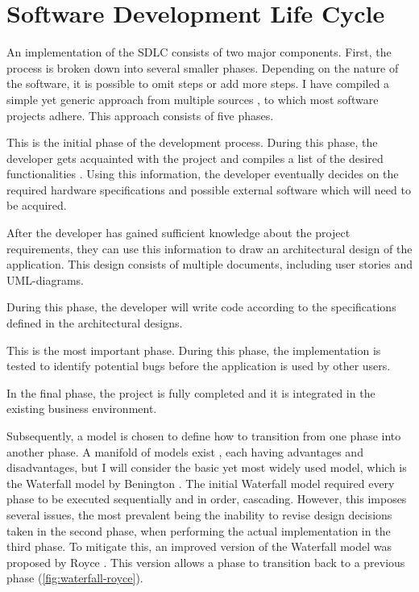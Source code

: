 
\section{Software Development Life Cycle}\label{sec:se-sdlc}
An implementation of the SDLC consists of two major components. First, the process is broken down into several smaller phases. Depending on the nature of the software, it is possible to omit steps or add more steps. I have compiled a simple yet generic approach from multiple sources \cite{2010govardhan, 7106435}, to which most software projects adhere. This approach consists of five phases.
\begin{enumerate}
	 This is the initial phase of the development process. During this phase, the developer gets acquainted with the project and compiles a list of the desired functionalities \cite{7106435}. Using this information, the developer eventually decides on the required hardware specifications and possible external software which will need to be acquired.
	
	 After the developer has gained sufficient knowledge about the project requirements, they can use this information to draw an architectural design of the application. This design consists of multiple documents, including user stories and UML-diagrams.
	
	 During this phase, the developer will write code according to the specifications defined in the architectural designs.
	
	 This is the most important phase. During this phase, the implementation is tested to identify potential bugs before the application is used by other users.
	
	 In the final phase, the project is fully completed and it is integrated in the existing business environment.
\end{enumerate}

\noindent Subsequently, a model is chosen to define how to transition from one phase into another phase. A manifold of models exist \cite{2010govardhan}, each having advantages and disadvantages, but I will consider the basic yet most widely used model, which is the Waterfall model by Benington \cite{united1956symposium}. The initial Waterfall model required every phase to be executed sequentially and in order, cascading. However, this imposes several issues, the most prevalent being the inability to revise design decisions taken in the second phase, when performing the actual implementation in the third phase. To mitigate this, an improved version of the Waterfall model was proposed by Royce \cite{Royce:1987:MDL:41765.41801}. This version allows a phase to transition back to a previous phase (\autoref{fig:waterfall-royce}).

